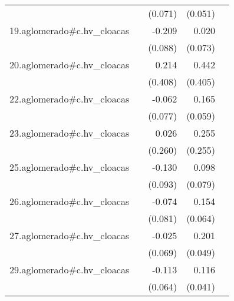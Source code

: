 {\begin{longtable}{l*{4}{D{.}{.}{-1}}}
            &                     &     (0.071)         &     (0.051)         &                     \\
\addlinespace
19.aglomerado#c.hv\_cloacas&                     &      -0.209\sym{*}  &       0.020         &                     \\
            &                     &     (0.088)         &     (0.073)         &                     \\
\addlinespace
20.aglomerado#c.hv\_cloacas&                     &       0.214         &       0.442         &                     \\
            &                     &     (0.408)         &     (0.405)         &                     \\
\addlinespace
22.aglomerado#c.hv\_cloacas&                     &      -0.062         &       0.165\sym{**} &                     \\
            &                     &     (0.077)         &     (0.059)         &                     \\
\addlinespace
23.aglomerado#c.hv\_cloacas&                     &       0.026         &       0.255         &                     \\
            &                     &     (0.260)         &     (0.255)         &                     \\
\addlinespace
25.aglomerado#c.hv\_cloacas&                     &      -0.130         &       0.098         &                     \\
            &                     &     (0.093)         &     (0.079)         &                     \\
\addlinespace
26.aglomerado#c.hv\_cloacas&                     &      -0.074         &       0.154\sym{*}  &                     \\
            &                     &     (0.081)         &     (0.064)         &                     \\
\addlinespace
27.aglomerado#c.hv\_cloacas&                     &      -0.025         &       0.201\sym{***}&                     \\
            &                     &     (0.069)         &     (0.049)         &                     \\
\addlinespace
29.aglomerado#c.hv\_cloacas&                     &      -0.113         &       0.116\sym{**} &                     \\
            &                     &     (0.064)         &     (0.041)         &                     \\

\end{longtable}}
